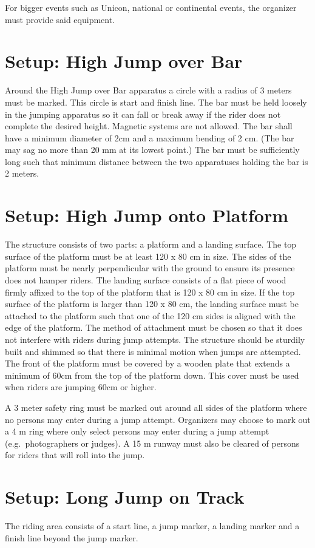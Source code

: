 For bigger events such as Unicon, national or continental events, the organizer must provide said equipment.

\section{Setup: High Jump over Bar}
Around the High Jump over Bar apparatus a circle with a radius of 3 meters must be marked.
This circle is start and finish line.
The bar must be held loosely in the jumping apparatus so it can fall or break away if the rider does not complete the desired height.
Magnetic systems are not allowed.
The bar shall have a minimum diameter of 2cm and a maximum bending of 2 cm.
(The bar may sag no more than 20 mm at its lowest point.)
The bar must be sufficiently long such that minimum distance between the two apparatuses holding the bar is 2 meters.

\section{Setup: High Jump onto Platform}
The structure consists of two parts: a platform and a landing surface.
The top surface of the platform must be at least 120 x 80 cm in size.
The sides of the platform must be nearly perpendicular with the ground to ensure its presence does not hamper riders.
The landing surface consists of a flat piece of wood firmly affixed to the top of the platform that is 120 x 80 cm in size.
If the top surface of the platform is larger than 120 x 80 cm, the landing surface must be attached to the platform such that one of the 120 cm sides is aligned with the edge of the platform.
The method of attachment must be chosen so that it does not interfere with riders during jump attempts.
The structure should be sturdily built and shimmed so that there is minimal motion when jumps are attempted.
The front of the platform must be covered by a wooden plate that extends a minimum of 60cm from the top of the platform down.
This cover must be used when riders are jumping 60cm or higher.

A 3 meter safety ring must be marked out around all sides of the platform where no persons may enter during a jump attempt.
Organizers may choose to mark out a 4 m ring where only select persons may enter during a jump attempt (e.g.\ photographers or judges).
A 15 m runway must also be cleared of persons for riders that will roll into the jump.

\section{Setup: Long Jump on Track}
The riding area consists of a start line, a jump marker, a landing marker and a finish line beyond the jump marker.

